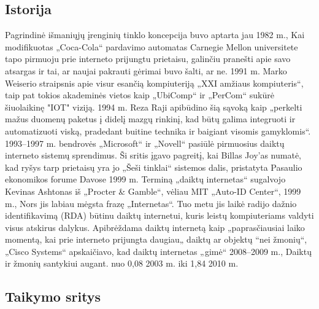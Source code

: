 \documentclass{VUMIFInfBakalaurinis}
\begin{document}
\subsection{Istorija}
Pagrindinė išmaniųjų įrenginių tinklo koncepcija buvo aptarta jau 1982 m.,
Kai modifikuotas „Coca-Cola“ pardavimo automatas Carnegie Mellon universitete tapo pirmuoju prie interneto prijungtu prietaisu, galinčiu pranešti apie savo atsargas ir tai, ar naujai pakrauti gėrimai buvo šalti, ar ne.
1991 m. Marko Weiserio straipsnis apie visur esančią kompiuteriją „XXI amžiaus kompiuteris“, taip pat tokios akademinės vietos kaip „UbiComp“ ir „PerCom“ sukūrė šiuolaikinę "IOT" viziją. 1994 m.
Reza Raji apibūdino šią sąvoką kaip „perkelti mažus duomenų paketus į didelį mazgų rinkinį, kad būtų galima integruoti ir automatizuoti viską, pradedant buitine technika ir baigiant visomis gamyklomis“.
1993–1997 m. bendrovės „Microsoft“ ir „Novell“ pasiūlė pirmuosius daiktų interneto sistemų sprendimus. Ši sritis įgavo pagreitį, kai Billas Joy'as numatė, kad ryšys tarp prietaisų yra jo „Šeši tinklai“ sistemos dalis, pristatyta 
Pasaulio ekonomikos forume Davose 1999 m. Terminą „daiktų internetas“ sugalvojo Kevinas Ashtonas iš „Procter \& Gamble“, vėliau MIT „Auto-ID Center“, 1999 m., Nors jis labiau mėgsta frazę „Internetas“. 
Tuo metu jis laikė radijo dažnio identifikavimą (RDA) būtinu daiktų internetui, kuris leistų kompiuteriams valdyti visus atskirus dalykus. Apibrėždama daiktų internetą kaip „paprasčiausiai laiko momentą,
kai prie interneto prijungta daugiau„ daiktų ar objektų “nei žmonių“, „Cisco Systems“ apskaičiavo, kad daiktų internetas „gimė“ 2008–2009 m., Daiktų ir žmonių santykiui augant. nuo 0,08 2003 m. iki 1,84 2010 m. \cite{Technologijos}
\subsection{Taikymo sritys}
\end{document}
